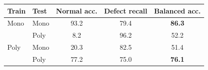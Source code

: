 \begin{tabular}{llccc}
\toprule
Train & Test & Normal acc. & Defect recall & Balanced acc. \\
\midrule
Mono & Mono & 93.2 & 79.4 & \textbf{86.3} \\
 & Poly & 8.2 & 96.2 & 52.2 \\
\midrule
Poly & Mono & 20.3 & 82.5 & 51.4 \\
 & Poly & 77.2 & 75.0 & \textbf{76.1} \\
\bottomrule
\end{tabular}
